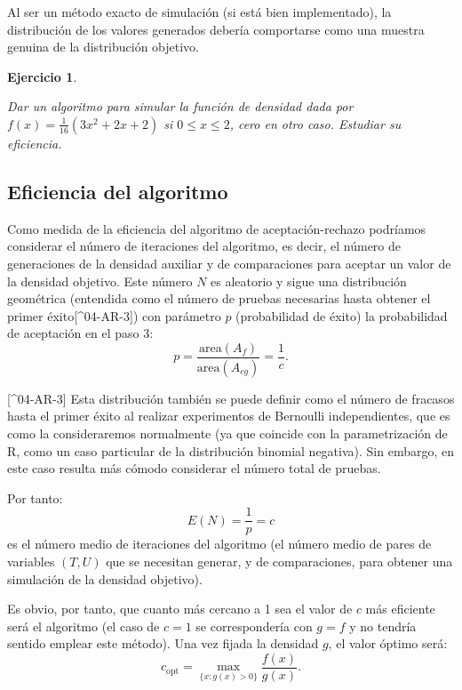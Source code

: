 \documentclass[
  10pt,
]{book}
\theoremstyle{break}
\newtheorem{exercise}{Ejercicio}[chapter]
\theoremstyle{nonumberplain}
\begin{document}
Al ser un método exacto de simulación (si está bien implementado), la distribución de los valores generados debería comportarse como una muestra genuina de la distribución objetivo.

\begin{exercise}
\protect\hypertarget{exr:dacotada-ar}{}\label{exr:dacotada-ar}

Dar un algoritmo para simular la función de densidad dada por
\(f\left(x\right) = \frac{1}{16} \left( 3x^{2}+2x+2 \right)\) si
\(0 \le x \le 2\), cero en otro caso. Estudiar su eficiencia.
\end{exercise}

\hypertarget{eficiencia-del-algoritmo}{%
\subsection{Eficiencia del algoritmo}\label{eficiencia-del-algoritmo}}

Como medida de la eficiencia del algoritmo de aceptación-rechazo podríamos considerar el número de iteraciones del algoritmo, es decir, el número de generaciones de la densidad auxiliar y de comparaciones para aceptar un valor de la densidad objetivo.
Este número \(N\) es aleatorio y sigue una distribución geométrica (entendida como el número de pruebas necesarias hasta obtener el primer éxito{[}\^{}04-AR-3{]}) con parámetro \(p\) (probabilidad de éxito) la probabilidad de aceptación en el paso 3:
\[p = \frac{\text{area}\left(A_{f}\right)}{\text{area}\left( A_{cg}\right)} = \frac{1}{c}.\]

{[}\^{}04-AR-3{]} Esta distribución también se puede definir como el número de fracasos hasta el primer éxito al realizar experimentos de Bernoulli independientes, que es como la consideraremos normalmente (ya que coincide con la parametrización de R, como un caso particular de la distribución binomial negativa).
Sin embargo, en este caso resulta más cómodo considerar el número total de pruebas.

Por tanto:
\[E\left( N \right) = \frac1p = c\]
es el número medio de iteraciones del algoritmo (el número medio de pares de variables \(\left( T,U\right)\) que se necesitan generar, y de comparaciones, para obtener una simulación de la densidad objetivo).

Es obvio, por tanto, que cuanto más cercano a 1 sea el valor de \(c\) más eficiente será el algoritmo (el caso de \(c=1\) se correspondería con \(g=f\) y no tendría sentido emplear este método).
Una vez fijada la densidad \(g\), el valor óptimo será:
\[c_{\text{opt}}=\max_{\{x : g(x) > 0\}} \frac{f(x)}{g(x)}.\]
\end{document}
